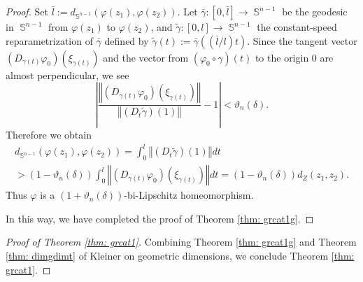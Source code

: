 \documentclass[a4paper,12pt]{amsart}
\newcommand{\Sph}{\operatorname{\mathbb{S}}}
\numberwithin{equation}{section}
\theoremstyle{plain}
\theoremstyle{definition}
\theoremstyle{remark}
\begin{document}
\begin{proof}
Set $\bar{l} := d_{\Sph^{n-1}} \left( \varphi(z_1), \varphi(z_2) \right)$.
Let $\bar{\gamma} \colon [0,\bar{l}] \to \Sph^{n-1}$ be 
the geodesic in $\Sph^{n-1}$
from $\varphi(z_1)$ to $\varphi(z_2)$, and
$\tilde{\gamma} \colon [0,l] \to \Sph^{n-1}$
the constant-speed reparametrization 
of $\bar{\gamma}$ defined by 
$\tilde{\gamma}(t) := \bar{\gamma} \left( (\bar{l}/l)t \right)$.
Since the tangent vector 
$\left( D_{\gamma(t)} \varphi_0 \right) \left( \xi_{\gamma(t)} \right)$
and the vector from $(\varphi_0 \circ \gamma)(t)$ to the origin $0$
are almost perpendicular,
we see
\[
\left\vert
\frac
{\left\Vert \left( D_{\gamma(t)} \varphi_0 \right) 
\left( \xi_{\gamma(t)} \right) \right\Vert}
{\left\Vert \left( D_t\tilde{\gamma} \right) (1) \right\Vert}
-1
\right\vert < \vartheta_n(\delta).
\]
Therefore we obtain
\begin{multline*}
d_{\Sph^{n-1}} \left( \varphi(z_1), \varphi(z_2) \right)
= \int_0^l \left\Vert \left( D_t\tilde{\gamma} \right) (1) \right\Vert dt \\
> \left( 1-\vartheta_n(\delta) \right) 
\int_0^l \left\Vert \left( D_{\gamma(t)} \varphi_0 \right) 
\left( \xi_{\gamma(t)} \right) \right\Vert dt
= \left( 1-\vartheta_n(\delta) \right) d_Z(z_1,z_2).
\end{multline*}
Thus $\varphi$ is a 
$\left( 1+\vartheta_n(\delta) \right)$-bi-Lipschitz homeomorphism.

In this way, 
we have completed the proof of Theorem \ref{thm: grcat1g}.
\end{proof}

\begin{proof}[Proof of Theorem \ref{thm: grcat1}]
Combining Theorem \ref{thm: grcat1g}
and Theorem \ref{thm: dimgdimt} of Kleiner \cite{kleiner}
on geometric dimensions,
we conclude Theorem \ref{thm: grcat1}.
\end{proof}

\end{document}

